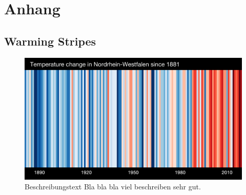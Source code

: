 \chapter*{Anhang}\label{ch:Anhang}

\setcounter{figure}{0}
\renewcommand{\thefigure}{\Alph{section}.\arabic{figure}}
\renewcommand{\thesection}{\Alph{section}} 
\setcounter{table}{0}
\renewcommand\thetable{\Alph{section}.\arabic{table}}


\section{Warming Stripes}
\begin{figure}[htbp]
	\centering
	\includegraphics[width=\textwidth]{anhang/_stripes_EUROPE-Germany-Nordrhein_Westfalen-1881-2019-DW-withlabels.png}
	\caption[Titel der Figure]{Beschreibungstext Bla bla bla viel beschreiben sehr gut. \cite{Hawkins.2019}}
	\label{fig:DieLableIhAuhhNooo}
\end{figure}

